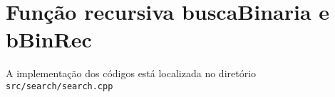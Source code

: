 \section{Função recursiva buscaBinaria e bBinRec}
A implementação dos códigos está localizada no diretório \texttt{src/search/search.cpp}



